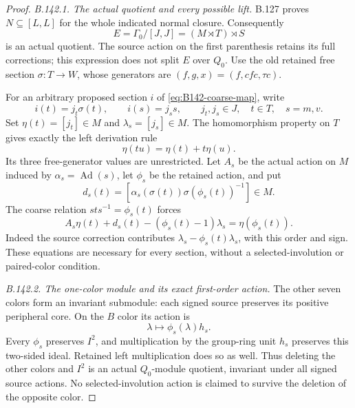 \begin{proof}
\emph{B.142.1. The actual quotient and every possible lift.}
B.127 proves $N\subseteq[L,L]$ for the whole indicated normal closure.
Consequently
\[
 E=\Gamma_0/[J,J]=(M\rtimes T)\rtimes S
\]
is an actual quotient. The source action on the first parenthesis
retains its full corrections; this expression does not split $E$
over $Q_0$. Use the old retained free section
$\sigma:T\to W$, whose generators are
$(f,g,x)=(f,cfc,\tau c)$.

For an arbitrary proposed section $i$ of \eqref{eq:B142-coarse-map},
write
\[
 i(t)=j_t\sigma(t),\qquad i(s)=j_s s,
 \qquad j_t,j_s\in J,\quad t\in T,\quad s=m,v.
\]
Set $\eta(t)=[j_t]\in M$ and $\lambda_s=[j_s]\in M$.
The homomorphism property on $T$ gives exactly the left derivation rule
\begin{equation}\label{eq:B142-derivation}
 \eta(tu)=\eta(t)+t\eta(u).
\end{equation}
Its three free-generator values are unrestricted. Let $A_s$ be the
actual action on $M$ induced by $\alpha_s=\operatorname{Ad}(s)$,
let $\phi_s$ be the retained action, and put
\[
 d_s(t)=
 [\alpha_s(\sigma(t))\sigma(\phi_s(t))^{-1}]\in M.
\]
The coarse relation $sts^{-1}=\phi_s(t)$ forces
\begin{equation}\label{eq:B142-section-equation}
 A_s\eta(t)+d_s(t)-(\phi_s(t)-1)\lambda_s
       =\eta(\phi_s(t)).
\end{equation}
Indeed the source correction contributes
$\lambda_s-\phi_s(t)\lambda_s$, with this order and sign.
These equations are necessary for every section, without a
selected-involution or paired-color condition.

\emph{B.142.2. The one-color module and its exact first-order action.}
The other seven colors form an invariant submodule: each signed source
preserves its positive peripheral core. On the $B$ color its action is
\[
 \lambda\longmapsto\phi_s(\lambda)h_s.
\]
Every $\phi_s$ preserves $I^2$, and multiplication by the group-ring
unit $h_s$ preserves this two-sided ideal. Retained left multiplication
does so as well. Thus deleting the other colors and $I^2$ is an actual
$Q_0$-module quotient, invariant under all signed source actions.
No selected-involution action is claimed to survive the deletion of
the opposite color.


\end{proof}
